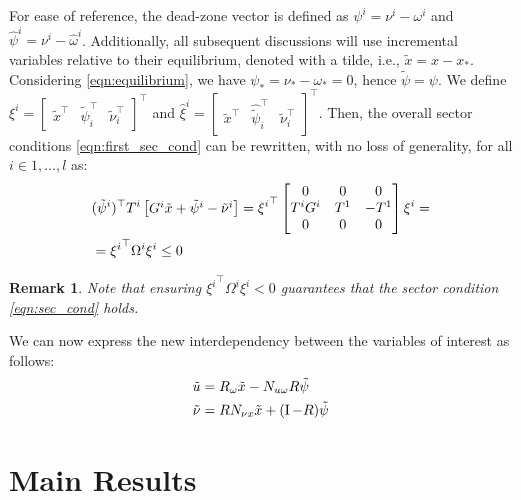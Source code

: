 \documentclass{ifacconf}
\theoremstyle{plain}
\newtheorem{remark}{Remark}
\begin{document}
For ease of reference, the dead-zone vector is defined as $\psi^i = \nu^i - \omega^i$ and $\widehat{\psi}^i = \nu^i - \widehat{\omega}^i$. Additionally, all subsequent discussions will use incremental variables relative to their equilibrium, denoted with a tilde, i.e., $\tilde{x} = x - x_*$. Considering \eqref{eqn:equilibrium}, we have $\psi_* = \nu_* - \omega_* = 0$, hence $\tilde{\psi} = \psi$. We define $\xi^i = \begin{bmatrix} \tilde{x}^\top & \tilde{\psi}_i^\top & \tilde{\nu}_i^\top \end{bmatrix}^\top$ and $\widehat{\xi}^i = \begin{bmatrix} \tilde{x}^\top & \widehat{\tilde{\psi}}_i^\top & \tilde{\nu}_i^\top \end{bmatrix}^\top$. Then, the overall sector conditions \eqref{eqn:first_sec_cond} can be rewritten, with no loss of generality, for all $i \in {1, \dots, l}$ as:
\begin{equation}\label{eqn:sec_cond}
\begin{aligned}
    &({\tilde{\psi}^i})^\top T^i \left[\begin{matrix}G^i \tilde{x} + \tilde{\psi}^i - \tilde{\nu}^i\end{matrix}\right] = {\xi^i}^\top \left[\begin{matrix}0 & 0 & 0\\
    T^i G^i & T^1 & -T^1\\
    0 & 0 & 0\end{matrix}\right] \xi^i = \\
    &= {\xi^i}^\top \Omega^i \xi^i \leq 0
\end{aligned}
\end{equation}

\begin{remark}\label{rem:sec-cond}
Note that ensuring ${\xi^i}^\top \Omega^i \xi^i < 0$ guarantees that the sector condition \eqref{eqn:sec_cond} holds.
\end{remark}

We can now express the new interdependency between the variables of interest as follows:
\begin{equation}\label{eqn:incremental}
  \begin{aligned}
    \tilde{u} &= R_{\omega} \tilde{x} - N_{u \omega} R \tilde{\psi}\\
    \tilde{\nu} &= R N_{\nu x} \tilde{x} + (\operatorname{I} - R) \tilde{\psi}
  \end{aligned}
\end{equation}

\section{Main Results}
\end{document}
